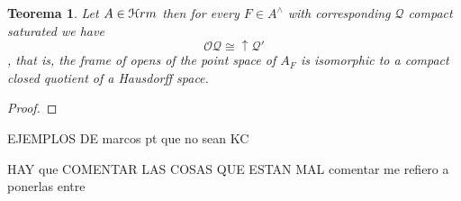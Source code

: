 \documentclass[11pt]{amsart}
\DeclareMathOperator{\pt}{pt}
\theoremstyle{plain}
\newtheorem{thm}{Teorema}[section]
\newtheorem{cor}[thm]{Corolario}
\newtheorem{prop}[thm]{Proposición}
\theoremstyle{definition}
\begin{document}









\begin{thm}\label{haus1}
Let $A\in\EuScript{H}rm$ then for every $F\in A^{\wedge}$ with corresponding $\mathcal{Q}$ compact saturated we have \[\mathcal{O}\mathcal{Q}\cong\uparrow\mathcal{Q}'\], that is,
the frame of opens of the point space of $A_{F}$ is isomorphic to a compact closed quotient of a Hausdorff space.
\end{thm}


\begin{proof}



\end{proof}

EJEMPLOS DE marcos pt que no sean KC

HAY que COMENTAR LAS COSAS QUE ESTAN MAL comentar me refiero a ponerlas entre 

	
\cite{escardo2001regular} \cite{escardo2006compactly}


\cite{sexton2006point}





\end{document}
